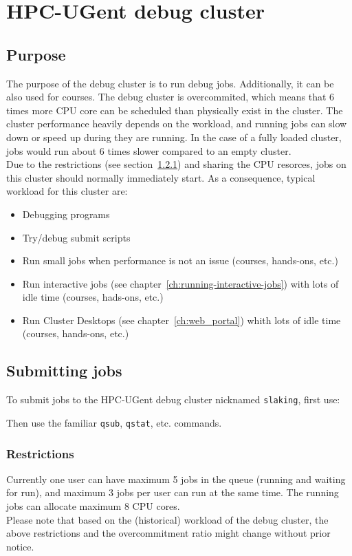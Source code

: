 \chapter{HPC-UGent debug cluster}
\label{ch:debug_ugent}


\section{Purpose}
\label{sec:debug_ugent_pupose}
The purpose of the debug cluster is to run debug jobs. Additionally, it can be also used for courses. 
The debug cluster is overcommited, which means that 6 times more CPU core can be
scheduled than physically exist in the cluster. The cluster performance heavily depends on the
workload, and running jobs can slow down or speed up during they are running.  In the case of a
fully loaded cluster, jobs would run about 6 times slower compared to an empty cluster. 
\\ Due to the restrictions (see section~\ref{subsec:debug_ugent_restrictions}) and sharing the CPU
resorces, jobs on this cluster should normally immediately start. As a consequence,
typical workload for this cluster are:
\begin{itemize}
  \item  Debugging programs
  \item  Try/debug submit scripts
  \item  Run small jobs when performance is not an issue (courses, hands-ons, etc.)
  \item  Run interactive jobs (see chapter~\ref{ch:running-interactive-jobs}) with lots of idle time
         (courses, hads-ons, etc.) 
  \item  Run Cluster Desktops (see chapter~\ref{ch:web_portal}) whith lots of idle time
         (courses, hands-ons, etc.)
\end{itemize} 

\section{Submitting jobs}
\label{sec:debug_ugent_jobs}

To submit jobs to the HPC-UGent debug cluster nicknamed \lstinline|slaking|, first use:

\begin{prompt}
\end{prompt}

Then use the familiar \lstinline|qsub|, \lstinline|qstat|, etc. commands.

\subsection{Restrictions}
\label{subsec:debug_ugent_restrictions}

Currently one user can have maximum 5 jobs in the queue (running and waiting for run), and 
maximum 3 jobs per user can run at the same time. The running jobs can allocate maximum 8
CPU cores. \\ Please note that based on the (historical) workload of the debug cluster,
the above restrictions and the overcommitment ratio might change without prior notice.
